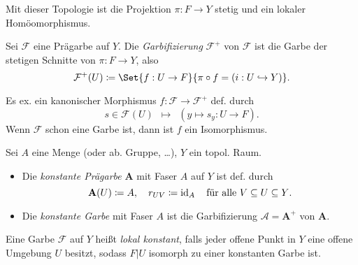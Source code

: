 \documentclass{cheat-sheet}
\newcommand{\Fais}{\mathcal{F}} %
\begin{document}
\begin{bem}
  Mit dieser Topologie ist die Projektion $\pi : F \to Y$ stetig und ein lokaler Homöomorphismus.
\end{bem}

\begin{defn}
  Sei $\Fais$ eine Prägarbe auf $Y$. Die \emph{Garbifizierung} $\Fais^+$ von $\Fais$ ist die Garbe der stetigen Schnitte von $\pi : F \to Y$, also
  \[ \Fais^+(U) \coloneqq \Set{f : U \to F}{\pi \circ f = (i : U \hookrightarrow Y)}. \]
\end{defn}

\begin{prop}
  Es ex. ein kanonischer Morphismus $f : \Fais \to \Fais^+$ def. durch
  \[ s \in \Fais(U) \enspace \mapsto \enspace (y \mapsto s_y : U \to F). \]
  Wenn $\Fais$ schon eine Garbe ist, dann ist $f$ ein Isomorphismus.
\end{prop}


\begin{defn}
  Sei $A$ eine Menge (oder ab. Gruppe, \ldots), $Y$ ein topol. Raum.
  \begin{itemize}
    \item Die \emph{konstante Prägarbe} $\mathbf{A}$ mit Faser $A$ auf $Y$ ist def. durch
    \[
      \mathbf{A}(U) \coloneqq A, \quad
      r_{UV} \coloneqq \operatorname{id}_A \quad
      \text{für alle $V \subseteq U \subseteq Y$.}
    \]
    \item Die \emph{konstante Garbe} mit Faser $A$ ist die Garbifizierung $\mathcal{A} = \mathbf{A}^+$ von $\mathbf{A}$.
  \end{itemize}
\end{defn}

\begin{defn}
  Eine Garbe $\Fais$ auf $Y$ heißt \emph{lokal konstant}, falls jeder offene Punkt in $Y$ eine offene Umgebung $U$ besitzt, sodass $F|U$ isomorph zu einer konstanten Garbe ist.
\end{defn}
\end{document}
